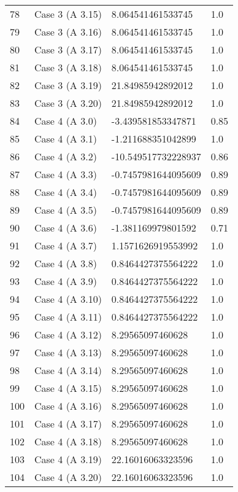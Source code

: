 \begin{tabularx}{\textwidth}{lXXX}
78 & Case 3 (A 3.15) & 8.064541461533745 & 1.0 \\
79 & Case 3 (A 3.16) & 8.064541461533745 & 1.0 \\
80 & Case 3 (A 3.17) & 8.064541461533745 & 1.0 \\
81 & Case 3 (A 3.18) & 8.064541461533745 & 1.0 \\
82 & Case 3 (A 3.19) & 21.84985942892012 & 1.0 \\
83 & Case 3 (A 3.20) & 21.84985942892012 & 1.0 \\
84 & Case 4 (A 3.0) & -3.439581853347871 & 0.85 \\
85 & Case 4 (A 3.1) & -1.211688351042899 & 1.0 \\
86 & Case 4 (A 3.2) & -10.549517732228937 & 0.86 \\
87 & Case 4 (A 3.3) & -0.7457981644095609 & 0.89 \\
88 & Case 4 (A 3.4) & -0.7457981644095609 & 0.89 \\
89 & Case 4 (A 3.5) & -0.7457981644095609 & 0.89 \\
90 & Case 4 (A 3.6) & -1.381169979801592 & 0.71 \\
91 & Case 4 (A 3.7) & 1.1571626919553992 & 1.0 \\
92 & Case 4 (A 3.8) & 0.8464427375564222 & 1.0 \\
93 & Case 4 (A 3.9) & 0.8464427375564222 & 1.0 \\
94 & Case 4 (A 3.10) & 0.8464427375564222 & 1.0 \\
95 & Case 4 (A 3.11) & 0.8464427375564222 & 1.0 \\
96 & Case 4 (A 3.12) & 8.29565097460628 & 1.0 \\
97 & Case 4 (A 3.13) & 8.29565097460628 & 1.0 \\
98 & Case 4 (A 3.14) & 8.29565097460628 & 1.0 \\
99 & Case 4 (A 3.15) & 8.29565097460628 & 1.0 \\
100 & Case 4 (A 3.16) & 8.29565097460628 & 1.0 \\
101 & Case 4 (A 3.17) & 8.29565097460628 & 1.0 \\
102 & Case 4 (A 3.18) & 8.29565097460628 & 1.0 \\
103 & Case 4 (A 3.19) & 22.16016063323596 & 1.0 \\
104 & Case 4 (A 3.20) & 22.16016063323596 & 1.0 \\
\end{tabularx}
